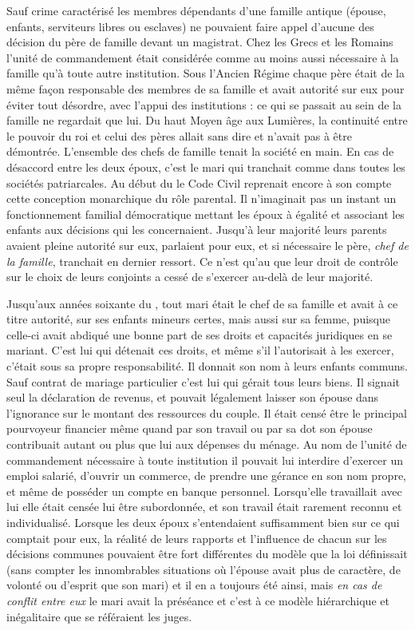  Sauf crime caractérisé les membres dépendants d'une famille antique (épouse, enfants, serviteurs libres ou esclaves) ne pouvaient faire appel d'aucune des décision du père de famille devant un magistrat. Chez les Grecs et les Romains l'unité de commandement était considérée comme au moins aussi nécessaire à la famille qu'à toute autre institution. Sous l'Ancien Régime chaque père était de la même façon responsable des membres de sa famille et avait autorité sur eux pour éviter tout désordre, avec l'appui des institutions : ce qui se passait au sein de la famille ne regardait que lui. Du haut Moyen âge aux Lumières, la continuité entre le pouvoir du roi et celui des pères allait sans dire et n'avait pas à être démontrée. L'ensemble des chefs de famille tenait la société en main. En cas de désaccord entre les deux époux, c'est le mari qui tranchait comme dans toutes les sociétés patriarcales. Au début du  le Code Civil reprenait encore à son compte cette conception monarchique du rôle parental. Il n'imaginait pas un instant un fonctionnement familial démocratique mettant les époux à égalité et associant les enfants aux décisions qui les concernaient. Jusqu'à leur majorité  leurs parents avaient pleine autorité sur eux, parlaient pour eux, et si nécessaire le père, \emph{chef de la famille}, tranchait en dernier ressort. Ce n'est qu'au  que leur droit de contrôle sur le choix de leurs conjoints a cessé de s'exercer au-delà de leur majorité.
 
 
 

  Jusqu'aux années soixante du , tout mari était le chef de sa famille et avait à ce titre autorité, sur ses enfants mineurs certes, mais aussi sur sa femme, puisque celle-ci avait abdiqué une bonne part de ses droits et capacités juridiques en se mariant. C'est lui qui détenait ces droits, et même s'il l'autorisait à les exercer, c'était sous sa propre responsabilité. Il donnait son nom à leurs enfants communs. Sauf contrat de mariage particulier c'est lui qui gérait tous leurs biens. Il signait seul la déclaration de revenus, et pouvait légalement laisser son épouse dans l'ignorance sur le montant des ressources du couple. Il était censé être le principal pourvoyeur financier même quand par son travail ou par sa dot son épouse contribuait autant ou plus que lui aux dépenses du ménage. Au nom de l'unité de commandement nécessaire à toute institution il pouvait lui interdire d'exercer un emploi salarié, d'ouvrir un commerce, de prendre une gérance en son nom propre, et même de posséder un compte en banque personnel. Lorsqu'elle travaillait avec lui elle était censée lui être subordonnée, et son travail était rarement reconnu et individualisé. 
Lorsque les deux époux s'entendaient suffisamment bien sur ce qui comptait pour eux, la réalité de leurs rapports et l'influence de chacun sur les décisions communes pouvaient être fort différentes du modèle que la loi définissait (sans compter les innombrables situations où l'épouse avait plus de caractère, de volonté ou d'esprit que son mari) et il en a toujours été ainsi, mais \emph{en cas de conflit entre eux} le mari avait la préséance et c'est à ce modèle hiérarchique et inégalitaire que se référaient les juges.

